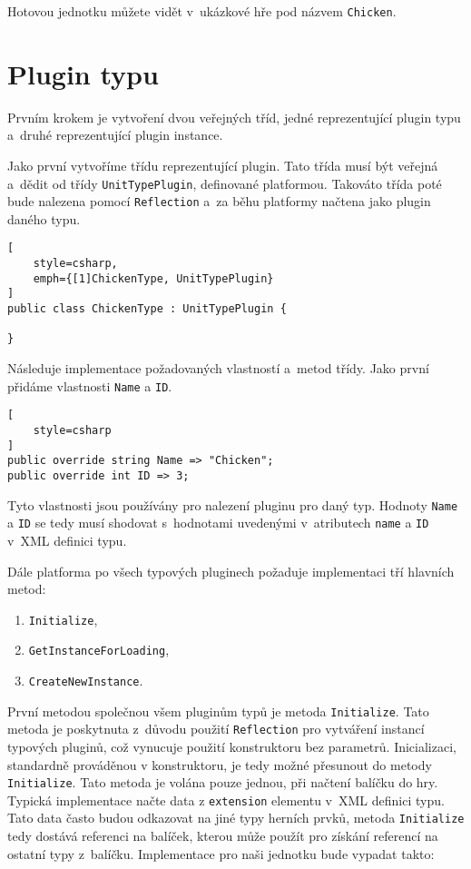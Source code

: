 Hotovou jednotku můžete vidět v~ukázkové hře pod názvem \texttt{Chicken}.

\section{Plugin typu}
Prvním krokem je vytvoření dvou veřejných tříd, jedné reprezentující plugin typu a~druhé reprezentující plugin instance. 

Jako první vytvoříme třídu reprezentující plugin. Tato třída musí být veřejná a~dědit od třídy \texttt{UnitTypePlugin}, definované platformou. Takováto třída poté bude nalezena pomocí \texttt{Reflection} a~za běhu platformy načtena jako plugin daného typu.  

\begin{lstlisting}[
	style=csharp,
	emph={[1]ChickenType, UnitTypePlugin}
]
public class ChickenType : UnitTypePlugin {

}
\end{lstlisting}

Následuje implementace požadovaných vlastností a~metod třídy. Jako první přidáme vlastnosti \texttt{Name} a \texttt{ID}.

\begin{lstlisting}[
	style=csharp
]
public override string Name => "Chicken";
public override int ID => 3;
\end{lstlisting}

Tyto vlastnosti jsou používány pro nalezení pluginu pro daný typ. Hodnoty \texttt{Name} a \texttt{ID} se tedy musí shodovat s~hodnotami uvedenými v~atributech \texttt{name} a \texttt{ID} v~XML definici typu.

Dále platforma po všech typových pluginech požaduje implementaci tří hlavních metod:

\begin{enumerate}
	\item \texttt{Initialize},
	\item \texttt{GetInstanceForLoading},
	\item \texttt{CreateNewInstance}.
\end{enumerate}


První metodou společnou všem pluginům typů je metoda \texttt{Initialize}. Tato metoda je poskytnuta z~důvodu použití \texttt{Reflection} pro vytváření instancí typových pluginů, což vynucuje použití konstruktoru bez parametrů. Inicializaci, standardně prováděnou v konstruktoru, je tedy možné přesunout do metody \texttt{Initialize}. Tato metoda je volána pouze jednou, při načtení balíčku do hry. Typická implementace načte data z \texttt{extension} elementu v~XML definici typu. Tato data často budou odkazovat na jiné typy herních prvků, metoda \texttt{Initialize} tedy dostává referenci na balíček, kterou může použít pro získání referencí na ostatní typy z~balíčku. Implementace pro naši jednotku bude vypadat takto: 


